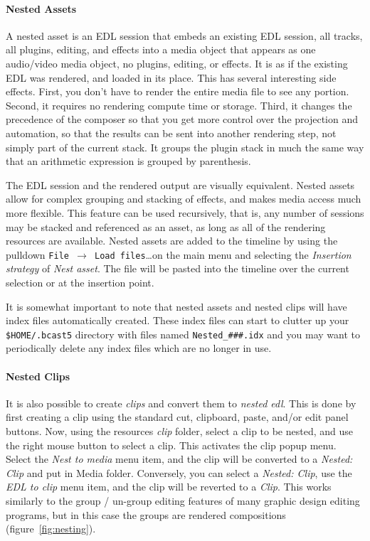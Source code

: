 \paragraph{Nested Assets} A nested asset is an EDL session that
embeds an existing EDL session, all tracks, all plugins, editing,
and effects into a media object that appears as one audio/video
media object, no plugins, editing, or effects.  It is as if the
existing EDL was rendered, and loaded in its place.  This has
several interesting side effects.  First, you don’t have to render
the entire media file to see any portion.  Second, it requires no
rendering compute time or storage.  Third, it changes the precedence
of the composer so that you get more control over the projection and
automation, so that the results can be sent into another rendering
step, not simply part of the current stack.  It groups the plugin
stack in much the same way that an arithmetic expression is grouped
by parenthesis.

The EDL session and the rendered output are visually equivalent.
Nested assets allow for complex grouping and stacking of effects,
and makes media access much more flexible.  This feature can be used
recursively, that is, any number of sessions may be stacked and
referenced as an asset, as long as all of the rendering resources
are available.  Nested assets are added to the timeline by using the
pulldown \texttt{File $\rightarrow$ Load files}\dots on the main
menu and selecting the \textit{Insertion strategy} of \textit{Nest
  asset}. The file will be pasted into the timeline over the current
selection or at the insertion point.

It is somewhat important to note that nested assets and nested clips
will have index files automatically created.  These index files can
start to clutter up your \texttt{\$HOME/.bcast5} directory with
files named \texttt{Nested\_\#\#\#.idx} and you may want to
periodically delete any index files which are no longer in use.

\paragraph{Nested Clips} It is also possible to create
\textit{clips} and convert them to \textit{nested edl}.  This is
done by first creating a clip using the standard cut, clipboard,
paste, and/or edit panel buttons.  Now, using the resources
\textit{clip} folder, select a clip to be nested, and use the right
mouse button to select a clip.  This activates the clip popup menu.
Select the \textit{Nest to media} menu item, and the clip will be
converted to a \textit{Nested: Clip} and put in Media
folder. Conversely, you can select a \textit{Nested: Clip}, use the
\textit{EDL to clip} menu item, and the clip will be reverted to a
\textit{Clip}.  This works similarly to the group / un-group editing
features of many graphic design editing programs, but in this case
the groups are rendered compositions (figure~\ref{fig:nesting}).

